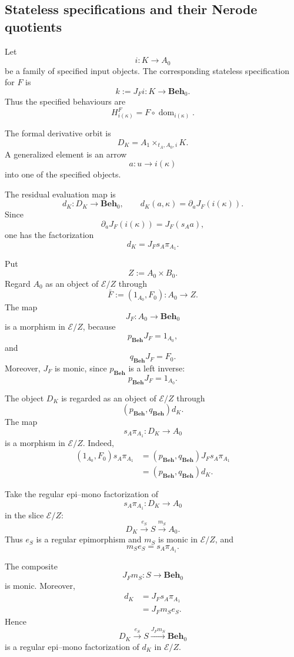 \subsection{Stateless specifications and their Nerode quotients}
\label{subsec:stateless-specifications-nerode}

Let
\[
    i:K\to A_0
\]
be a family of specified input objects. The corresponding stateless
specification for \(F\) is
\[
    k:=J_Fi:K\to\mathbf{Beh}_0.
\]
Thus the specified behaviours are
\[
    H^F_{i(\kappa)}
    =
    F\circ\operatorname{dom}_{i(\kappa)}.
\]

The formal derivative orbit is
\[
    D_K
    =
    A_1\times_{t_A,A_0,i}K.
\]
A generalized element is an arrow
\[
    a:u\to i(\kappa)
\]
into one of the specified objects.

The residual evaluation map is
\[
    d_K:D_K\to\mathbf{Beh}_0,
    \qquad
    d_K(a,\kappa)
    =
    \partial_aJ_F(i(\kappa)).
\]
Since
\[
    \partial_aJ_F(i(\kappa))
    =
    J_F(s_Aa),
\]
one has the factorization
\[
    d_K
    =
    J_Fs_A\pi_{A_1}.
\]

Put
\[
    Z:=A_0\times B_0.
\]
Regard \(A_0\) as an object of \(\mathcal E/Z\) through
\[
    \bar F
    :=
    (1_{A_0},F_0):
    A_0\to Z.
\]
The map
\[
    J_F:A_0\to\mathbf{Beh}_0
\]
is a morphism in \(\mathcal E/Z\), because
\[
    p_{\mathbf{Beh}}J_F=1_{A_0},
\]
and
\[
    q_{\mathbf{Beh}}J_F=F_0.
\]
Moreover, \(J_F\) is monic, since \(p_{\mathbf{Beh}}\) is a left inverse:
\[
    p_{\mathbf{Beh}}J_F=1_{A_0}.
\]

The object \(D_K\) is regarded as an object of \(\mathcal E/Z\) through
\[
    (p_{\mathbf{Beh}},q_{\mathbf{Beh}})d_K.
\]
The map
\[
    s_A\pi_{A_1}:D_K\to A_0
\]
is a morphism in \(\mathcal E/Z\). Indeed,
\[
    \begin{aligned}
        (1_{A_0},F_0)s_A\pi_{A_1}
        &=
        (p_{\mathbf{Beh}},q_{\mathbf{Beh}})
        J_Fs_A\pi_{A_1}
        \\
        &=
        (p_{\mathbf{Beh}},q_{\mathbf{Beh}})d_K.
    \end{aligned}
\]

Take the regular epi--mono factorization of
\[
    s_A\pi_{A_1}:D_K\to A_0
\]
in the slice \(\mathcal E/Z\):
\[
    D_K
        \xrightarrow{e_S}
    S
        \xrightarrow{m_S}
    A_0.
\]
Thus \(e_S\) is a regular epimorphism and \(m_S\) is monic in
\(\mathcal E/Z\), and
\[
    m_Se_S=s_A\pi_{A_1}.
\]

The composite
\[
    J_Fm_S:S\to\mathbf{Beh}_0
\]
is monic. Moreover,
\[
    \begin{aligned}
        d_K
        &=
        J_Fs_A\pi_{A_1}
        \\
        &=
        J_Fm_Se_S.
    \end{aligned}
\]
Hence
\[
    D_K
        \xrightarrow{e_S}
    S
        \xrightarrow{J_Fm_S}
    \mathbf{Beh}_0
\]
is a regular epi--mono factorization of \(d_K\) in \(\mathcal E/Z\).

